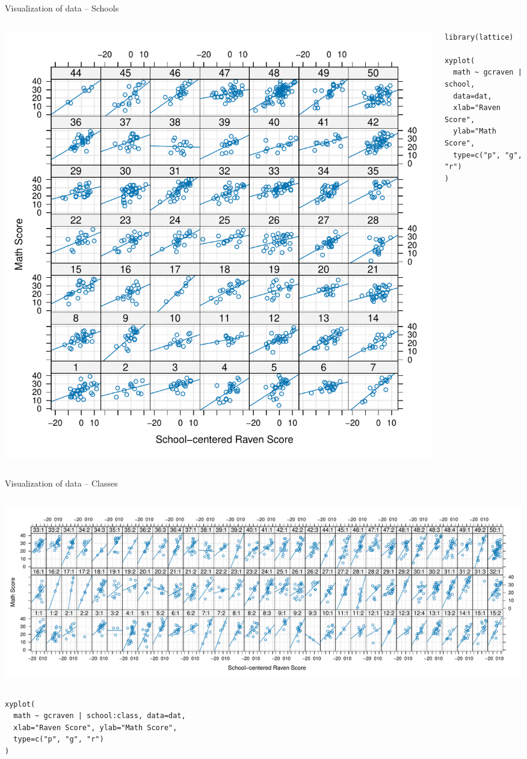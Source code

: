 \documentclass{beamer}
\begin{document}
\begin{frame}[fragile]{Visualization of data -- Schools}
  \begin{columns}
    \begin{column}{7cm}
      \includegraphics[scale=.4]{../figures/jsp_lattice1}
    \end{column}
    \begin{column}{5cm}
      \begin{lstlisting}[style=plain]
library(lattice)

xyplot(
  math ~ gcraven | school,
  data=dat,
  xlab="Raven Score",
  ylab="Math Score",
  type=c("p", "g", "r")
)
      \end{lstlisting}
    \end{column}
  \end{columns}
\end{frame}

\begin{frame}[fragile]{Visualization of data -- Classes}
  \begin{columns}
    \begin{column}{15cm}
      \includegraphics[scale=.34]{../figures/jsp_lattice2}
    \end{column}
  \end{columns}
\begin{lstlisting}[style=plain]
xyplot(
  math ~ gcraven | school:class, data=dat,
  xlab="Raven Score", ylab="Math Score", 
  type=c("p", "g", "r")
)
\end{lstlisting}

\end{frame}
\end{document}
